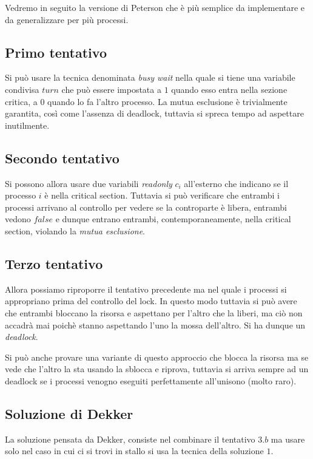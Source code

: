 \documentclass{article}
\begin{document}
Vedremo in seguito la versione di Peterson che \`e pi\`u semplice da
implementare e da generalizzare per pi\`u processi.

\subsection{Primo tentativo}

Si pu\`o usare la tecnica denominata \emph{busy wait} nella quale si tiene una
variabile condivisa $turn$ che pu\`o essere impostata a $1$ quando esso entra
nella sezione critica, a $0$ quando lo fa l'altro processo. La mutua esclusione
\`e trivialmente garantita, cos\`i come l'assenza di deadlock, tuttavia si spreca
tempo ad aspettare inutilmente.

\subsection{Secondo tentativo}

Si possono allora usare due variabili \emph{readonly} $c_i$ all'esterno che
indicano se il processo $i$ \`e nella critical section. Tuttavia si pu\`o
verificare che entrambi i processi arrivano al controllo per vedere se la
controparte \`e libera, entrambi vedono $false$ e dunque entrano entrambi,
contemporaneamente, nella critical section, violando la \emph{mutua esclusione}.

\subsection{Terzo tentativo}

Allora possiamo riproporre il tentativo precedente ma nel quale i processi
si appropriano prima del controllo del lock. In questo modo tuttavia si pu\`o
avere che entrambi bloccano la risorsa e aspettano per l'altro che la liberi, ma
ci\`o non accadr\`a mai poich\`e stanno aspettando l'uno la mossa dell'altro.
Si ha dunque un \emph{deadlock}.

Si pu\`o anche provare una variante di questo approccio che blocca la risorsa ma
se vede che l'altro la sta usando la sblocca e riprova, tuttavia si arriva sempre
ad un deadlock se i processi venogno eseguiti perfettamente all'unisono (molto raro).

\subsection{Soluzione di Dekker}

La soluzione pensata da Dekker, consiste nel combinare il tentativo $3.b$ ma
usare solo nel caso in cui ci si trovi in stallo si usa la tecnica della
soluzione $1$.
\end{document}
